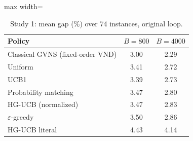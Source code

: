 \begin{table}[t]
\caption{Study 1: mean gap (\%) over 74 instances, original loop.}\label{tab:s1}
\centering
\small
\begin{adjustbox}{max width=\linewidth}
\begin{tabular}{lcc}
\toprule
Policy & $B=800$ & $B=4000$ \\
\midrule
Classical GVNS (fixed-order VND) & 3.00 & 2.29 \\
Uniform & 3.41 & 2.72 \\
UCB1 & 3.39 & 2.73 \\
Probability matching & 3.47 & 2.80 \\
HG-UCB (normalized) & 3.47 & 2.83 \\
$\varepsilon$-greedy & 3.50 & 2.86 \\
HG-UCB literal & 4.43 & 4.14 \\
\bottomrule
\end{tabular}
\end{adjustbox}
\end{table}
